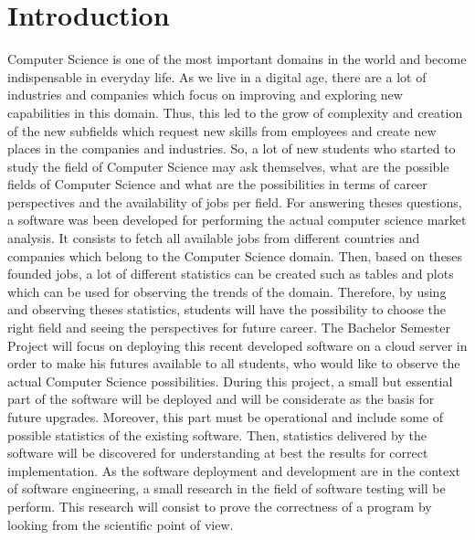 \documentclass[conference,compsoc]{IEEEtran}
\begin{document}
\section{Introduction}
Computer Science is one of the most important domains in the world and become indispensable in everyday life. As we live in a digital age, there are a lot of industries and companies which focus on improving and exploring new capabilities in this domain. Thus, this led to the grow of complexity and creation of the new subfields which request new skills from employees and create new places in the companies and industries.  
\newline\newline                                                                                                                                       
So, a lot of new students who started to study the field of Computer Science may ask themselves, what are the possible fields of Computer Science and what are the possibilities in terms of career perspectives and the availability of jobs per field.
For answering theses questions, a software was been developed for performing the actual computer science market analysis. It consists to fetch all available jobs from different countries and companies which belong to the Computer Science domain. Then, based on theses founded jobs, a lot of different statistics can be created such as tables and plots which can be used for observing the trends of the domain. Therefore, by using and observing theses statistics, students will have the possibility to choose the right field and seeing the perspectives for future career. 
\newline\newline                                                                  
The Bachelor Semester Project will focus on deploying this recent developed software on a cloud server in order to make his futures available to all students, who would like to observe the actual Computer Science possibilities.                     
\newline                                                                                                              
During this project, a small but essential part of the software will be deployed and will be considerate as the basis for future upgrades. Moreover, this part must be operational and include some of possible statistics of the existing software. Then, statistics delivered by the software will be discovered for understanding at best the results for correct implementation.    
\newline                                                      
As the software deployment and development are in the context of software engineering, a small research in the field of software testing will be perform. This research will consist to prove the correctness of a program by looking from the scientific point of view. 
\end{document}
